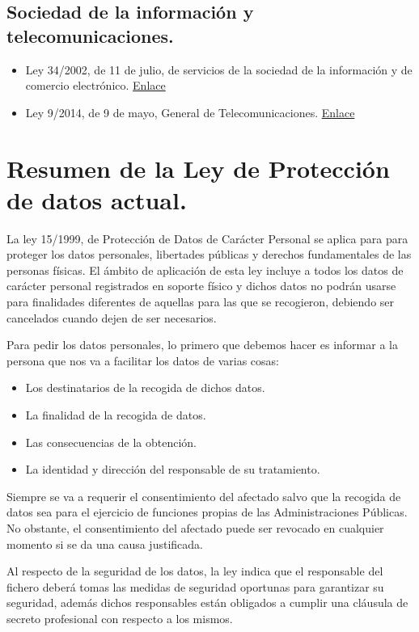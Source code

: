 	\subsection{Sociedad de la información y telecomunicaciones.}
		\begin{itemize}
			\item Ley 34/2002, de 11 de julio, de servicios de la sociedad de la información y de comercio electrónico. \href{https://www.boe.es/buscar/act.php?id=BOE-A-2002-13758}{Enlace}
			\item Ley 9/2014, de 9 de mayo, General de Telecomunicaciones. \href{https://www.boe.es/buscar/act.php?id=BOE-A-2014-4950}{Enlace}
		\end{itemize}
\newpage
\section{Resumen de la Ley de Protección de datos actual.}
	La ley 15/1999, de Protección de Datos de Carácter Personal se aplica para para proteger los datos personales, libertades públicas y derechos fundamentales de las personas físicas. El ámbito de aplicación de esta ley incluye a todos los datos de carácter personal registrados en soporte físico y dichos datos no podrán usarse para finalidades diferentes de aquellas para las que se recogieron, debiendo ser cancelados cuando dejen de ser necesarios.
	
	\newp Para pedir los datos personales, lo primero que debemos hacer es informar a la persona que nos va a facilitar los datos de varias cosas:
	\begin{itemize}
		\item Los destinatarios de la recogida de dichos datos.
		\item La finalidad de la recogida de datos.
		\item Las consecuencias de la obtención.
		\item La identidad y dirección del responsable de su tratamiento.
	\end{itemize}
	
	\newp Siempre se va a requerir el consentimiento del afectado salvo que la recogida de datos sea  para el ejercicio de funciones propias de las Administraciones Públicas. No obstante, el consentimiento del afectado puede ser revocado en cualquier momento si se da una causa justificada.
	
	\newp Al respecto de la seguridad de los datos, la ley indica que el responsable del fichero deberá tomas las medidas de seguridad oportunas para garantizar su seguridad, además dichos responsables están obligados a cumplir una cláusula de secreto profesional con respecto a los mismos.
	

